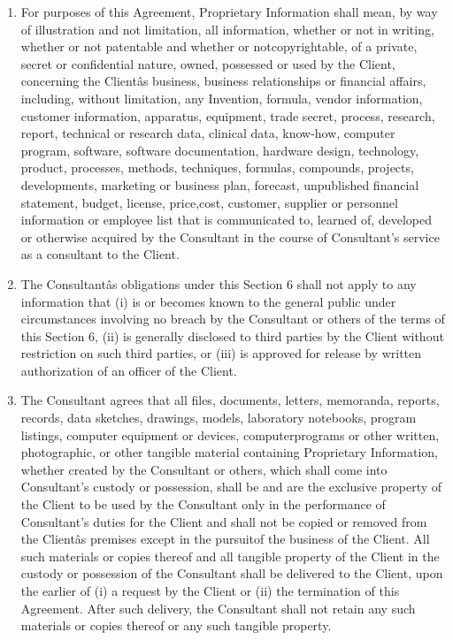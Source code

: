 \documentclass[12pt]{article}
\begin{document}
\begin{enumerate}
\begin{enumerate}
\begin{enumerate}[(1)]
            \item For purposes of this Agreement, Proprietary Information shall mean, by way of illustration and not limitation, all information, whether or not in writing, whether or not patentable and whether or notcopyrightable, of a private, secret or confidential nature, owned, possessed or used by the Client, concerning the Clientâs business, business relationships or financial affairs, including, without limitation, any Invention, formula, vendor information, customer information, apparatus, equipment, trade secret, process, research, report, technical or research data, clinical data, know-how, computer program, software, software documentation, hardware design, technology, product, processes, methods, techniques, formulas, compounds, projects, developments, marketing or business plan, forecast, unpublished financial statement, budget, license, price,cost, customer, supplier or personnel information or employee list that is communicated to, learned of, developed or otherwise acquired by the Consultant in the course of Consultant's service as a consultant to the Client.
            \item The Consultantâs obligations under this Section 6 shall not apply to any information that (i) is or becomes known to the general public under circumstances involving no breach by the Consultant or others of the terms of this Section 6, (ii) is generally disclosed to third parties by the Client without restriction on such third parties, or (iii) is approved for release by written authorization of an officer of the Client.
            \item The Consultant agrees that all files, documents, letters, memoranda, reports, records, data sketches, drawings, models, laboratory notebooks, program listings, computer equipment or devices, computerprograms or other written, photographic, or other tangible material containing Proprietary Information, whether created by the Consultant or others, which shall come into Consultant's custody or possession, shall be and are the exclusive property of the Client to be used by the Consultant only in the performance of Consultant's duties for the Client and shall not be copied or removed from the Clientâs premises except in the pursuitof the business of the Client.  All such materials or copies thereof and all tangible property of the Client in the custody or possession of the Consultant shall be delivered to the Client, upon the earlier of (i) a request by the Client or (ii) the termination of this Agreement.  After such delivery, the Consultant shall not retain any such materials or copies thereof or any such tangible property.

\end{enumerate}
\end{enumerate}
\end{enumerate}
\end{document}
